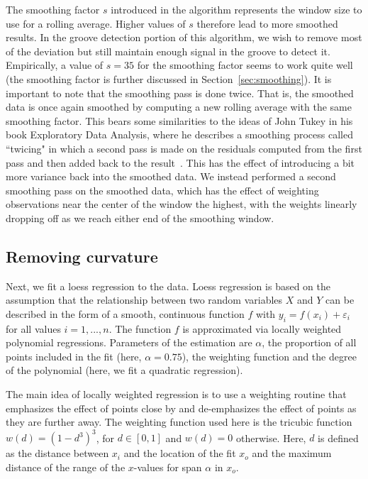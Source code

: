\documentclass[aoas, preprint]{imsart}\usepackage[]{graphicx}\usepackage[]{color}
\begin{document}
The smoothing factor $s$ introduced in the algorithm represents the window size to use for a rolling average. Higher values of $s$ therefore lead to more smoothed results. In the groove detection portion of this algorithm, we wish to remove most of the deviation but still maintain enough signal in the groove to detect it. Empirically, a value of $s = 35$ for the smoothing factor seems to work quite well (the smoothing factor is further discussed in Section~\ref{sec:smoothing}). It is important to note that the smoothing pass is done twice. That is, the smoothed data is once again smoothed by computing a new rolling average with the same smoothing factor. This bears some similarities to the ideas of John Tukey in his book Exploratory Data Analysis, where he describes a smoothing process called ``twicing" in which a second pass is made on the residuals computed from the first pass and then added back to the result~\citep{tukey:1977}. This has the effect of introducing a bit more variance back into the smoothed data. 
We instead performed a second smoothing pass on the smoothed data, which has the effect of weighting observations near the center of the window the highest, with the weights linearly dropping off as we reach either end of the smoothing window.

\subsection{Removing curvature}
Next, we fit a loess regression to the data. Loess regression \citep{cleveland:1979} is based on the assumption that the relationship between two random variables $X$ and $Y$ can be described in the form of a smooth, continuous function $f$ with $y_i = f(x_i) + \varepsilon_i$ for all values $i = 1, ..., n$. The function $f$ is approximated via locally weighted polynomial regressions. Parameters of the estimation are $\alpha$, the proportion of all points included in the fit (here, $\alpha = 0.75$), the weighting function and the degree of the polynomial (here, we fit a quadratic regression). 

The main idea of locally weighted regression is to use a weighting routine that  emphasizes the effect of points close by and de-emphasizes the effect of points as they are further away. The weighting function used here is the tricubic function $w(d) = \left(1 - d^3\right)^3$, for $d \in [0,1]$ and $w(d) = 0$ otherwise. Here, $d$ is defined as the distance between $x_i$ and the location of the fit $x_o$ and the maximum distance of the range of the $x$-values for span $\alpha$ in $x_o$. 
\end{document}

